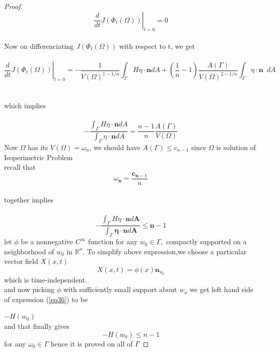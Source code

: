 \documentclass[oneside]{book}
\begin{document}
\begin{proof}
		
		$$\left.\frac{d}{d t} J\left(\Phi_{t}(\Omega)\right)\right|_{t=0} = 0 $$ \\ 
		Now on differenciating $J(\Phi_{t}(\Omega))$ with respect to t,
		we get \\\\
		$$\left.\frac{d}{d t} J\left(\Phi_{t}(\Omega)\right)\right|_{t=0} =  -\frac{1}{V(\Omega)^{1-1 / n}} \int_{\Gamma} H \eta \cdot \mathbf{n} d A+\left(\frac{1}{n}-1\right) \frac{A(\Gamma)}{V(\Omega)^{2-1 / n}} \int_{\Gamma} \eta \cdot \mathbf{n} \hspace{6pt} d A 
		$$ \\\\
		which implies \\\\
		$$
		-\frac{\int_{\Gamma} H \eta \cdot \mathbf{n} d A}{\int_{\Gamma} \eta \cdot \mathbf{n} d A}=\frac{n-1}{n} \frac{A(\Gamma)}{V(\Omega)}
		$$
		Now $\Omega$ has its $V(\Omega) = \omega_{n}$, we should have $A(\Gamma) \leq c_{n-1}$ since $\Omega $ is solution of Isoperimetric Problem \\
		recall that \\ $$ \omega_{\mathbf{n}}=\frac{\mathbf{c}_{\mathbf{n}-1}}{n}$$ \\
		together  implies \\\\
		\begin{equation}
		\label{eq36}
		-\frac{\int_{\Gamma} H \eta \cdot \mathbf{n} d \boldsymbol{A}}{\int_{\Gamma} \boldsymbol{\eta} \cdot \mathbf{n} d \boldsymbol{A}} \leq \boldsymbol{n}-1 
		\end{equation}
		let $\phi$ be a nonnegative $C^{\infty}$ function for any $w_{0} \in \Gamma,$ compactly supported on a neighborhood of $w_{0}$ in $\mathbb{R}^{n}$.
		To simplify above expression,we choose a particular vector field $X(x, t)$  \\
		$$
		X(x, t)=\phi(x) \mathbf{n}_{u_{0}}
		$$
		which is time-independent.
		\\
		and now picking $\phi$ with sufficiently small support about $w_{o}$ we get left hand side of expression (\ref{eq36}) to be 
		
		$ -H\left(w_{0}\right )$ \\
		
		and that finally gives
		\\
		$$ -H(w_{0})\leq n-1 $$ 
		for any $ \omega_{0} \in \Gamma$ hence it is proved on all of $\Gamma$ 
	\end{proof}
	
	
	
\end{document}
